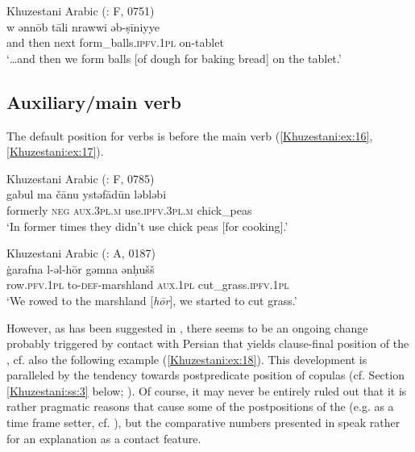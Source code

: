 \documentclass[output=paper,colorlinks,citecolor=brown,draftmode]{langscibook}
\begin{document}
\ea\label{Khuzestani:ex:15}
Khuzestani Arabic (\citealt{leitnerArabic2021}: F, 0751) \\
\gll w ənnōb tāli nrawwi əb-ṣīniyye \\
and then next form\_balls\textsc{.ipfv.1pl} on-tablet \\
\glt `…and then we form balls [of dough for baking bread] on the tablet.' 
\z

\subsection{Auxiliary/main verb }\label{Khuzestani:ss:2.6}

The default position for  verbs is before the main verb (\ref{Khuzestani:ex:16}, \ref{Khuzestani:ex:17}).

\ea\label{Khuzestani:ex:16}
Khuzestani Arabic (\citealt{leitnerArabic2021}: F, 0785) \\
\gll gabul ma čānu ystəfādūn ləbləbi \\
formerly \textsc{neg} \textsc{aux.3pl.m} use\textsc{.ipfv.3pl.m} chick\_peas \\
\glt `In former times they didn't use chick peas [for cooking].' 
\z

\ea\label{Khuzestani:ex:17}
Khuzestani Arabic (\citealt{leitnerArabic2021}: A, 0187) \\
\gll ġarafna l-əl-hōr gəmna ənḥušš \\
row\textsc{.pfv.1pl} to\textsc{-def-}marshland \textsc{aux.1pl} cut\_grass\textsc{.ipfv.1pl} \\
\glt `We rowed to the marshland [\textit{hōr}], we started to cut grass.' 
\z

However, as has been suggested in \citet{leitnerContact-induced2020,leitnerClause-final2022}, there seems to be an ongoing change probably triggered by contact with Persian that yields clause-final position of the , cf. also the following example (\ref{Khuzestani:ex:18}). This development is paralleled by the tendency towards postpredicate position of copulas (cf. Section \ref{Khuzestani:ss:3} below; \citealt{leitnerClause-final2022}). Of course, it may never be entirely ruled out that it is rather pragmatic reasons that cause some of the postpositions of the  (e.g. as a time frame setter, cf. \citealt{brustad2000}), but the comparative numbers presented in \citet{leitnerClause-final2022} speak rather for an explanation as a contact feature.
\end{document}
